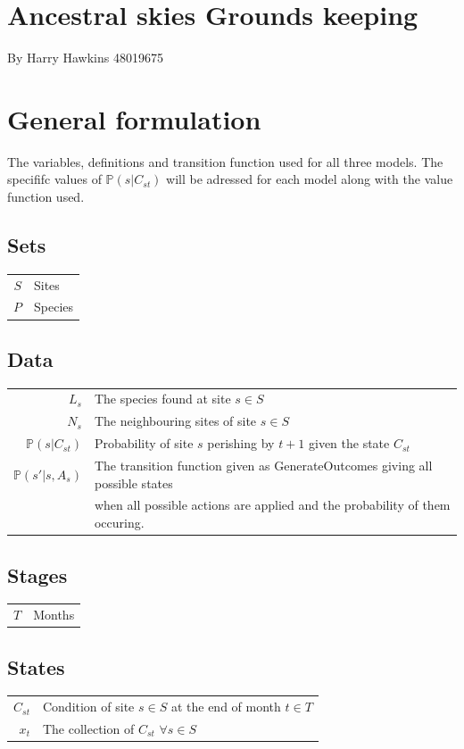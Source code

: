 \documentclass{article}
\begin{document}
	\section*{Ancestral skies Grounds keeping}
	By Harry Hawkins 48019675
	
	\section*{General formulation}
	The variables, definitions and transition function used for all three models.
	The specififc values of $\mathds{P}(s | C_{st})$ will be adressed for each model along with the value function used.

	\subsection*{Sets}
	\begin{tabular}{rl}
		$S$ & Sites\\
		$P$ & Species
	\end{tabular}

	\subsection*{Data}
	\begin{tabular}{rl}
		$L_s$ & The species found at site $s\in S$\\
		$N_s$ & The neighbouring sites of site $s\in S$\\
		$\mathds{P}(s | C_{st})$ & Probability of site $s$ perishing by $t+1$ given the state $C_{st}$\\
		$\mathds{P}(s' | s, A_s)$ & The transition function given as GenerateOutcomes giving all possible states\\
		& when all possible actions are applied and the probability of them occuring.
		
	\end{tabular}
		

	\subsection*{Stages}
	\begin{tabular}{rl}
		$T$ & Months
	\end{tabular}

	\subsection*{States}
	\begin{tabular}{rl}
		$C_{st}$ & Condition of site $s\in S$ at the end of month $t\in T$\\
		$x_t$ & The collection of $C_{st}$ $\forall s\in S$
	\end{tabular}
\end{document}
